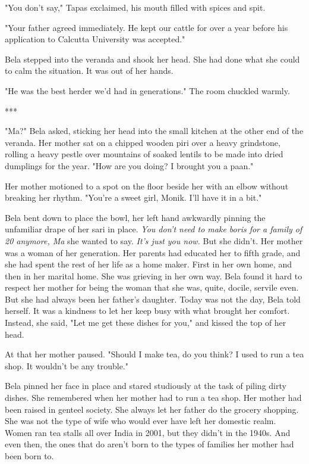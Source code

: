 \documentclass{amsart}
\begin{document}
"You don't say," Tapas exclaimed, his mouth filled with spices and spit.

"Your father agreed immediately. He kept our cattle for over a year before his application to Calcutta University was accepted."

Bela stepped into the veranda and shook her head. She had done what she could to calm the situation. It was out of her hands.

"He was the best herder we'd had in generations." The room chuckled warmly.

\begin{center} *** \end{center}

"Ma?" Bela asked, sticking her head into the small kitchen at the other end of the veranda. Her mother sat on a chipped wooden piri over a heavy grindstone, rolling a heavy pestle over mountains of soaked lentils to be made into dried dumplings for the year. "How are you doing? I brought you a paan." 

Her mother motioned to a spot on the floor beside her with an elbow without breaking her rhythm. "You're a sweet girl, Monik. I'll have it in a bit."

Bela bent down to place the bowl, her left hand awkwardly pinning the unfamiliar drape of her sari in place. \emph{You don't need to make boris for a family of 20 anymore, Ma} she wanted to say. \emph{It's just you now.} But she didn't. Her mother was a woman of her generation. Her parents had educated her to fifth grade, and she had spent the rest of her life as a home maker. First in her own home, and then in her marital home. She was grieving in her own way. Bela found it hard to respect her mother for being the woman that she was, quite, docile, servile even. But she had always been her father's daughter. Today was not the day, Bela told herself. It was a kindness to let her keep busy with what brought her comfort. Instead, she said, "Let me get these dishes for you," and kissed the top of her head.

At that her mother paused. "Should I make tea, do you think? I used to run a tea shop. It wouldn't be any trouble." 

Bela pinned her face in place and stared studiously at the task of piling dirty dishes. She remembered when her mother had to run a tea shop. Her mother had been raised in genteel society. She always let her father do the grocery shopping. She was not the type of wife who would ever have left her domestic realm. Women ran tea stalls all over India in 2001, but they didn't in the 1940s. And even then, the ones that do aren't born to the types of families her mother had been born to. 
\end{document}
